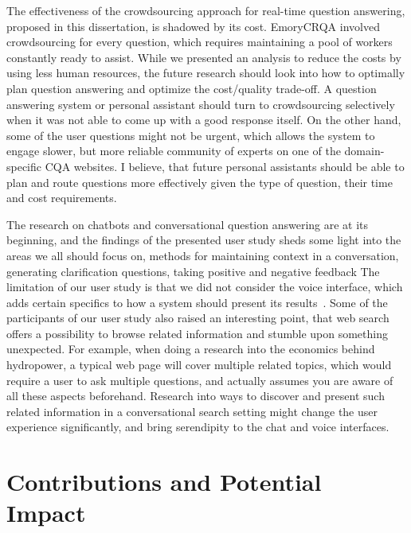 The effectiveness of the crowdsourcing approach for real-time question answering, proposed in this dissertation, is shadowed by its cost.
EmoryCRQA involved crowdsourcing for every question, which requires maintaining a pool of workers constantly ready to assist.
While we presented an analysis to reduce the costs by using less human resources, the future research should look into how to optimally plan question answering and optimize the cost/quality trade-off.
A question answering system or personal assistant should turn to crowdsourcing selectively when it was not able to come up with a good response itself.
On the other hand, some of the user questions might not be urgent, which allows the system to engage slower, but more reliable community of experts on one of the domain-specific CQA websites.
I believe, that future personal assistants should be able to plan and route questions more effectively given the type of question, their time and cost requirements.

The research on chatbots and conversational question answering are at its beginning, and the findings of the presented user study sheds some light into the areas we all should focus on, \eg methods for maintaining context in a conversation, generating clarification questions, taking positive and negative feedback \etc
The limitation of our user study is that we did not consider the voice interface, which adds certain specifics to how a system should present its results~\cite{trippas2015results}.
Some of the participants of our user study also raised an interesting point, that web search offers a possibility to browse related information and stumble upon something unexpected.
For example, when doing a research into the economics behind hydropower, a typical web page will cover multiple related topics, which would require a user to ask multiple questions, and actually assumes you are aware of all these aspects beforehand.
Research into ways to discover and present such related information in a conversational search setting might change the user experience significantly, and bring serendipity to the chat and voice interfaces.


\section{Contributions and Potential Impact}
\label{section:conclusion:contributions}


